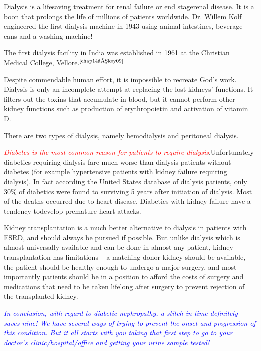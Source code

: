 
Dialysis is a lifesaving treatment for renal failure or end stage\break renal disease. It is a boon that prolongs the life of millions of patients worldwide. Dr. Willem Kolf engineered the first dialysis machine in 1943 using animal intestines, beverage cans and a washing machine!

The first dialysis facility in India was established in 1961 at the Christian Medical College, Vellore.$^{\text{\cite{chap14–key09}}}$

Despite commendable human effort, it is impossible to recreate God’s work. Dialysis is only an incomplete attempt at replacing the lost kidneys’ functions. It filters out the toxins that accumulate in blood, but it cannot perform other kidney functions such as production of erythropoietin and activation of vitamin D.

There are two types of dialysis, namely hemodialysis and peritoneal dialysis.

\textcolor{red}{\textit{Diabetes is the most common reason for patients to require dialysis}}.\break Unfortunately diabetics requiring dialysis fare much worse than dia\-lysis patients without diabetes (for example hypertensive patients with kidney failure requiring dialysis). In fact according the United States database of dialysis patients, only 30\% of diabetics were found to survi\-ving 5 years after initiation of dialysis. Most of the deaths occurred due to heart disease. Diabetics with kidney failure have a tendency to\break develop premature heart attacks.


Kidney transplantation is a much better alternative to dialysis in patients with ESRD, and should always be pursued if possible. But unlike dialysis which is almost universally available and can be done in almost any patient, kidney transplantation has limitations – a matching donor kidney should be available, the patient should be healthy enough to undergo a major surgery, and most importantly patients should be in a position to afford the costs of surgery and medications that need to be taken lifelong after surgery to prevent rejection of the transplanted kidney.

\textcolor{blue}{\textit{In conclusion, with regard to diabetic nephropathy, a stitch in time defi\-nitely saves nine! We have several ways of trying to prevent the onset and progression of this condition. But it all starts with you taking that first step to go to your doctor’s clinic/hospital/office and getting your urine sample tested!}}

